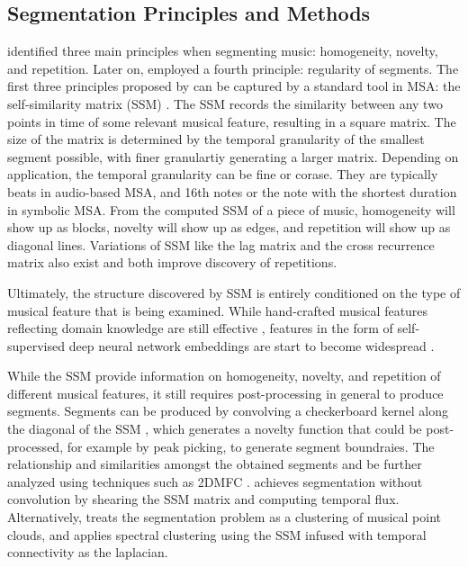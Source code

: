 
\subsection{Segmentation Principles and Methods}
\cite{paulus2010audio} identified three main principles when segmenting music: homogeneity, novelty, and repetition.
Later on, \cite{sargent2011regularity} emplo­yed a fourth principle: regularity of segments.
The first three principles proposed by \citeauthor{paulus2010audio} can be captured by a standard tool in MSA: the self-similarity matrix (SSM) \citep{foote1999visualizing}.
The SSM records the similarity between any two points in time of some relevant musical feature, resulting in a square matrix.
The size of the matrix is determined by the temporal granularity of the smallest segment possible, with finer granulartiy generating a larger matrix.
Depending on application, the temporal granularity can be fine or corase.
They are typically beats in audio-based MSA, and 16th notes or the note with the shortest duration in symbolic MSA.
From the computed SSM of a piece of music, homogeneity will show up as blocks, novelty will show up as edges, and repetition will show up as diagonal lines.
Variations of SSM like the lag matrix \citep{goto2003lag} and the cross recurrence matrix \citep{serra2009cross} also exist and both improve discovery of repetitions.

Ultimately, the structure discovered by SSM is entirely conditioned on the type of musical feature that is being examined.
While hand-crafted musical features reflecting domain knowledge are still effective \citep{mcfee2014_spectral}, features in the form of self-supervised deep neural network embeddings are start to become widespread \citep{salamon2021, mccallum2019unsupervised}.

While the SSM provide information on homogeneity, novelty, and repetition of different musical features, it still requires post-processing in general to produce segments.
Segments can be produced by convolving a checkerboard kernel along the diagonal of the SSM \citep{foote2000automatic}, which generates a novelty function that could be post-processed, for example by peak picking, to generate segment boundraies.
The relationship and similarities amongst the obtained segments and be further analyzed using techniques such as 2DMFC \citep{nieto2014}.
\cite{serra2014} achieves segmentation without convolution by shearing the SSM matrix and computing temporal flux.
Alternatively, \cite{mcfee2014_spectral} treats the segmentation problem as a clustering of musical point clouds, and applies spectral clustering using the SSM infused with temporal connectivity as the laplacian.

